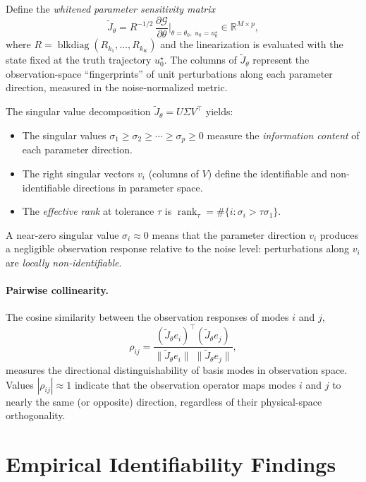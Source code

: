 \documentclass[11pt]{article}
\theoremstyle{definition}
\begin{document}
Define the \emph{whitened parameter sensitivity matrix}
\begin{equation}\label{eq:jtilde}
\widetilde{J}_\theta
= R^{-1/2}\,\frac{\partial \mathcal{G}}{\partial \theta}
\bigg|_{\theta=\theta_0,\; u_0 = u_0^\star}
\in \mathbb{R}^{M \times p},
\end{equation}
where $R = \operatorname{blkdiag}(R_{k_1},\ldots,R_{k_K})$ and the
linearization is evaluated with the state fixed at the truth
trajectory $u_0^\star$.  The columns of $\widetilde{J}_\theta$ represent
the observation-space ``fingerprints'' of unit perturbations along
each parameter direction, measured in the noise-normalized metric.

The singular value decomposition
$\widetilde{J}_\theta = U\Sigma V^\top$ yields:
\begin{itemize}
\item The singular values $\sigma_1 \ge \sigma_2 \ge \cdots \ge
  \sigma_p \ge 0$ measure the \emph{information content} of each
  parameter direction.
\item The right singular vectors $v_i$ (columns of $V$) define
  the identifiable and non-identifiable directions in parameter
  space.
\item The \emph{effective rank} at tolerance $\tau$ is
  $\operatorname{rank}_\tau = \#\{i : \sigma_i > \tau \sigma_1\}$.
\end{itemize}

A near-zero singular value $\sigma_i \approx 0$ means that the
parameter direction $v_i$ produces a negligible observation response
relative to the noise level: perturbations along $v_i$ are
\emph{locally non-identifiable}.

\paragraph{Pairwise collinearity.}
The cosine similarity between the observation responses of modes $i$
and $j$,
\[
\rho_{ij} = \frac{
  (\widetilde{J}_\theta e_i)^\top
  (\widetilde{J}_\theta e_j)
}{
  \|\widetilde{J}_\theta e_i\|\;
  \|\widetilde{J}_\theta e_j\|
},
\]
measures the directional distinguishability of basis modes in
observation space.  Values $|\rho_{ij}| \approx 1$ indicate that the
observation operator maps modes $i$ and $j$ to nearly the same
(or opposite) direction, regardless of their physical-space
orthogonality.

\section{Empirical Identifiability Findings}
\label{sec:findings}
\end{document}
